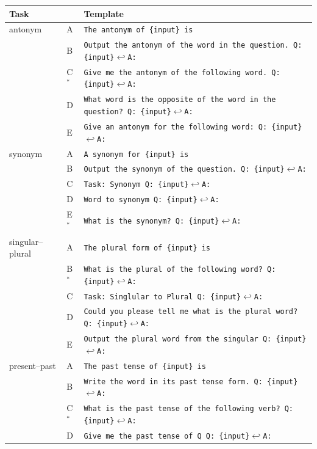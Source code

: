 {\footnotesize\frenchspacing
\begin{longtable}{@{}ll>{\raggedright\arraybackslash}p{}@{}}
\toprule
Task & & Template \\
\midrule
\endhead
\bottomrule
\endfoot
antonym & A & \texttt{The antonym of \{input\} is} \\
 & B & \texttt{Output the antonym of the word in the question. Q: \{input\}$\hookleftarrow$A:} \\
 & C$^\ast$ & \texttt{Give me the antonym of the following word. Q: \{input\}$\hookleftarrow$A:} \\
 & D & \texttt{What word is the opposite of the word in the question? Q: \{input\}$\hookleftarrow$A:} \\
 & E & \texttt{Give an antonym for the following word: Q: \{input\}$\hookleftarrow$A:} \\[3pt]
synonym & A & \texttt{A synonym for \{input\} is} \\
 & B & \texttt{Output the synonym of the question. Q: \{input\}$\hookleftarrow$A:} \\
 & C & \texttt{Task: Synonym Q: \{input\}$\hookleftarrow$A:} \\
 & D & \texttt{Word to synonym Q: \{input\}$\hookleftarrow$A:} \\
 & E$^\ast$ & \texttt{What is the synonym? Q: \{input\}$\hookleftarrow$A:} \\[3pt]
singular--plural & A & \texttt{The plural form of \{input\} is} \\
 & B$^\ast$ & \texttt{What is the plural of the following word? Q: \{input\}$\hookleftarrow$A:} \\
 & C & \texttt{Task: Singlular to Plural Q: \{input\}$\hookleftarrow$A:} \\
 & D & \texttt{Could you please tell me what is the plural word? Q: \{input\}$\hookleftarrow$A:} \\
 & E & \texttt{Output the plural word from the singular Q: \{input\}$\hookleftarrow$A:} \\[3pt]
present--past & A & \texttt{The past tense of \{input\} is} \\
 & B & \texttt{Write the word in its past tense form. Q: \{input\}$\hookleftarrow$A:} \\
 & C$^\ast$ & \texttt{What is the past tense of the following verb? Q: \{input\}$\hookleftarrow$A:} \\
 & D & \texttt{Give me the past tense of \textquotesingle{}Q\textquotesingle{} Q: \{input\}$\hookleftarrow$A:} \\

\end{longtable}}
